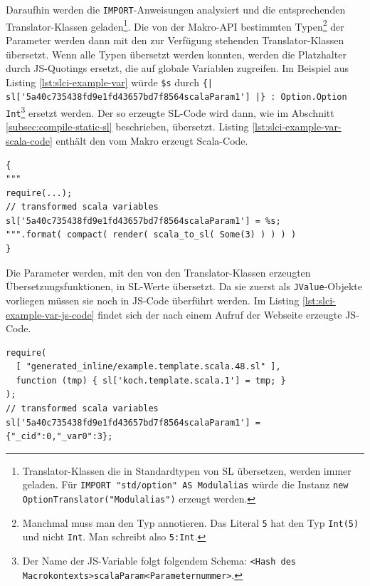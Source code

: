 \documentclass[12pt]{scrreprt}
\begin{document}
Daraufhin werden die \lstinline!IMPORT!-Anweisungen analysiert und die entsprechenden Translator-Klassen geladen\footnote{Translator-Klassen die in Standardtypen von SL übersetzen, werden immer geladen. Für \lstinline!IMPORT "std/option" AS Modulalias! würde die Instanz \lstinline!new OptionTranslator("Modulalias")! erzeugt werden.}. Die von der Makro-API bestimmten Typen\footnote{Manchmal muss man den Typ annotieren. Das Literal \lstinline!5! hat den Typ \lstinline!Int(5)! und nicht \lstinline!Int!. Man schreibt also \lstinline!5:Int!.} der Parameter werden dann mit den zur Verfügung stehenden Translator-Klassen übersetzt. 
Wenn alle Typen übersetzt werden konnten, werden die Platzhalter durch \ac{JS}-Quotings ersetzt, die auf globale Variablen zugreifen. Im Beispiel aus Listing \ref{lst:slci-example-var} würde \lstinline!$s! durch \lstinline!{| sl['5a40c735438fd9e1fd43657bd7f8564scalaParam1'] |} : Option.Option Int!\footnote{Der Name der JS-Variable folgt folgendem Schema: \lstinline!<Hash des Macrokontexts>scalaParam<Parameternummer>!.} ersetzt werden. Der so erzeugte SL-Code wird dann, wie im Abschnitt \ref{subsec:compile-static-sl} beschrieben, übersetzt. 
Listing \ref{lst:slci-example-var-scala-code} enthält den vom Makro erzeugt Scala-Code. 

\begin{lstlisting}[caption={Erzeugter Scala-Code zum Listing \ref{lst:slci-example-var}}, label=lst:slci-example-var-scala-code, float=h]
{ 
"""
require(...);
// transformed scala variables    
sl['5a40c735438fd9e1fd43657bd7f8564scalaParam1'] = %s;
""".format( compact( render( scala_to_sl( Some(3) ) ) ) )
}
\end{lstlisting}

Die Parameter werden, mit den von den Translator-Klassen erzeugten Übersetzungsfunktionen, in \ac{SL}-Werte übersetzt. Da sie zuerst als \lstinline!JValue!-Objekte vorliegen müssen sie noch in \ac{JS}-Code überführt werden. Im Listing \ref{lst:slci-example-var-js-code} findet sich der nach einem Aufruf der Webseite erzeugte \ac{JS}-Code.

\begin{lstlisting}[caption={JS-Code zum Listing \ref{lst:slci-example-var}}, label=lst:slci-example-var-js-code, float=h]
require( 
  [ "generated_inline/example.template.scala.48.sl" ],
  function (tmp) { sl['koch.template.scala.1'] = tmp; }
);
// transformed scala variables 
sl['5a40c735438fd9e1fd43657bd7f8564scalaParam1'] = {"_cid":0,"_var0":3};
\end{lstlisting}
\end{document}
